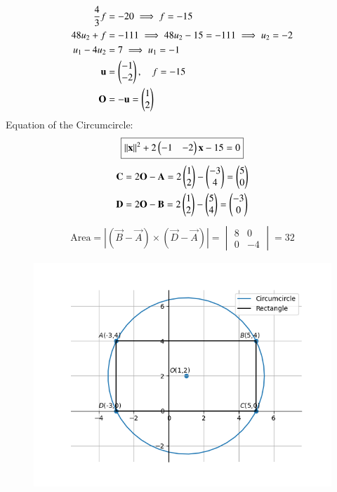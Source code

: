 \documentclass[journal]{article}
\begin{document}
\begin{align}
\frac{4}{3} f &= -20 \implies f = -15 \\
48 u_2 + f &= -111 \implies 48 u_2 - 15 = -111 \implies u_2 = -2 \\
u_1 - 4 u_2 &= 7 \implies  u_1 = -1\\
\mathbf{u} &= \begin{pmatrix}-1 \\ -2\end{pmatrix}, \quad f = -15\\
\mathbf{O} &= -\mathbf{u} = \begin{pmatrix}1 \\ 2\end{pmatrix}
\end{align}
Equation of the Circumcircle:
\begin{align}
\boxed{||\mathbf{x}||^2+2\begin{pmatrix}-1 & -2\end{pmatrix}\mathbf{x}-15=0}
\end{align}
\begin{align}
\mathbf{C} &= 2\mathbf{O} - \mathbf{A} = 2\begin{pmatrix}1 \\ 2\end{pmatrix} - \begin{pmatrix}-3 \\ 4\end{pmatrix} = \begin{pmatrix}5 \\ 0\end{pmatrix} \\
\mathbf{D} &= 2\mathbf{O} - \mathbf{B} = 2\begin{pmatrix}1 \\ 2\end{pmatrix} - \begin{pmatrix}5 \\ 4\end{pmatrix} = \begin{pmatrix}-3 \\ 0\end{pmatrix}
\end{align}
\begin{align}
\text{Area}=|(\vec{B} - \vec{A}) \times (\vec{D} -\vec{A})| =
\begin{vmatrix} 8 & 0 \\ 0 & -4 \end{vmatrix} = 32
\end{align}

\newpage
\begin{figure}
    \centering
    \includegraphics[width=1.0\linewidth]{figs/fig1.png}
    \caption{}
    \label{fig:placeholder}
\end{figure}
\end{document}
